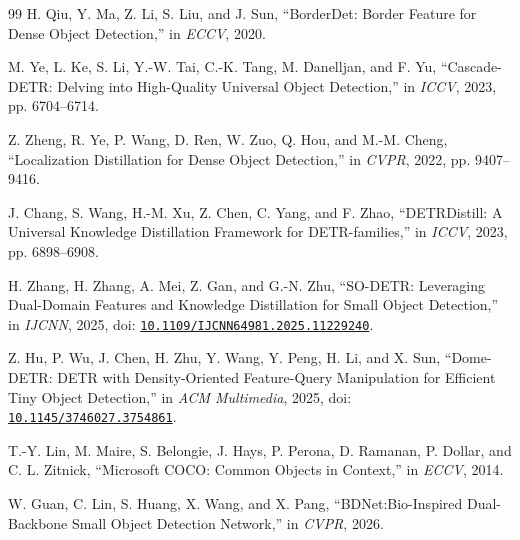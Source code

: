 \begin{thebibliography}{99}
 H. Qiu, Y. Ma, Z. Li, S. Liu, and J. Sun, ``BorderDet: Border Feature for Dense Object Detection,'' in \emph{ECCV}, 2020.

 M. Ye, L. Ke, S. Li, Y.-W. Tai, C.-K. Tang, M. Danelljan, and F. Yu, ``Cascade-DETR: Delving into High-Quality Universal Object Detection,'' in \emph{ICCV}, 2023, pp. 6704--6714.

 Z. Zheng, R. Ye, P. Wang, D. Ren, W. Zuo, Q. Hou, and M.-M. Cheng, ``Localization Distillation for Dense Object Detection,'' in \emph{CVPR}, 2022, pp. 9407--9416.

 J. Chang, S. Wang, H.-M. Xu, Z. Chen, C. Yang, and F. Zhao, ``DETRDistill: A Universal Knowledge Distillation Framework for DETR-families,'' in \emph{ICCV}, 2023, pp. 6898--6908.

 H. Zhang, H. Zhang, A. Mei, Z. Gan, and G.-N. Zhu, ``SO-DETR: Leveraging Dual-Domain Features and Knowledge Distillation for Small Object Detection,'' in \emph{IJCNN}, 2025, doi: \href{https://doi.org/10.1109/IJCNN64981.2025.11229240}{\nolinkurl{10.1109/IJCNN64981.2025.11229240}}.

 Z. Hu, P. Wu, J. Chen, H. Zhu, Y. Wang, Y. Peng, H. Li, and X. Sun, ``Dome-DETR: DETR with Density-Oriented Feature-Query Manipulation for Efficient Tiny Object Detection,'' in \emph{ACM Multimedia}, 2025, doi: \href{https://doi.org/10.1145/3746027.3754861}{\nolinkurl{10.1145/3746027.3754861}}.

 T.-Y. Lin, M. Maire, S. Belongie, J. Hays, P. Perona, D. Ramanan, P. Dollar, and C. L. Zitnick, ``Microsoft COCO: Common Objects in Context,'' in \emph{ECCV}, 2014.

 W. Guan, C. Lin, S. Huang, X. Wang, and X. Pang, ``BDNet:Bio-Inspired Dual-Backbone Small Object Detection Network,'' in \emph{CVPR}, 2026.

\end{thebibliography}


